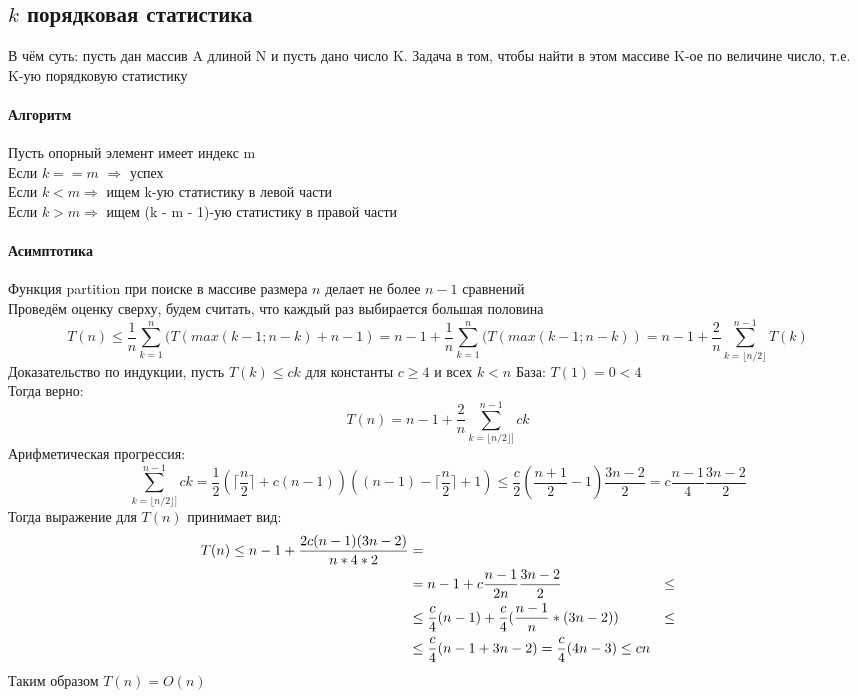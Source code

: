 \documentclass[a4paper,10pt]{article}
\begin{document}
	\subsection{$k$ порядковая статистика}
	В чём суть: пусть дан массив A длиной N и пусть дано число K. Задача в том, чтобы найти в этом массиве K-ое по величине число, т.е. K-ую порядковую статистику
	\paragraph{Алгоритм}
	Пусть опорный элемент имеет индекс m \\
	Если $k == m$ $\Rightarrow$ успех \\
	Если $k < m \Rightarrow$ ищем k-ую статистику в левой части \\
	Если $k > m \Rightarrow$ ищем (k - m - 1)-ую статистику в правой части \\
	\paragraph{Асимптотика}
	Функция partition при поиске в массиве размера $n$ делает не более $n-1$ сравнений \\
	Проведём оценку сверху, будем считать, что каждый раз выбирается большая половина \\
	\[
		T(n) \leq \frac{1}{n} \sum_{k=1}^{n} (T(max(k-1; n - k) + n - 1) = n - 1 + \frac{1}{n} \sum_{k=1}^{n} (T(max(k-1; n - k)) = n - 1 + \frac{2}{n}\sum_{k = \lfloor n/2 \rfloor}^{n-1} T(k)
	\]
	Доказательство по индукции, пусть $T(k) \leq ck$ для константы $c \geq 4$ и всех $k<n$
	База: $T(1) = 0 < 4$ \\
	Тогда верно:
	\[
		T(n) = n - 1 + \frac{2}{n}\sum_{k = \lfloor n/2 \rfloor]}^{n-1} ck
	\]
	Арифметическая прогрессия:
	\[
		\sum_{k = \lfloor n/2 \rfloor]}^{n-1} ck = \frac{1}{2}(\lceil \frac{n}{2} \rceil + c(n-1))((n-1) - \lceil \frac{n}{2} \rceil + 1) \leq \frac{c}{2}(\frac{n+1}{2} - 1) \frac{3n - 2}{2} = c \frac{n - 1}{4} \frac{3n - 2}{2}
	\]
	Тогда выражение для $T(n)$ принимает вид:
	\begin{align}
		T(n) \leq n - 1 + \frac{2c(n-1)(3n-2)}{n*4*2} &= \notag\\
		&= n - 1 + c \frac{n - 1}{2n} \frac{3n - 2}{2} &\leq \notag\\ 
		&\leq \frac{c}{4} (n-1) + \frac{c}{4}(\frac{n - 1}{n}*(3n - 2)) &\leq \notag\\
		&\leq \frac{c}{4}(n - 1 + 3n - 2) = \frac{c}{4}(4n - 3) \leq cn \notag
	\end{align}
	Таким образом $T(n) = O(n)$
\end{document}
